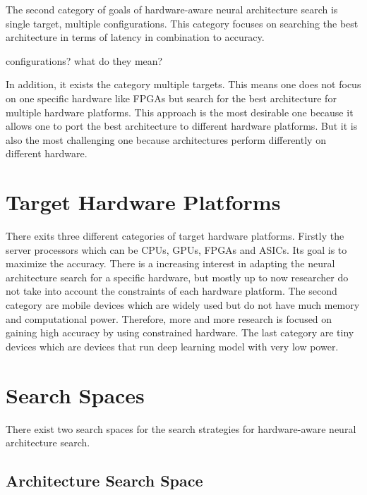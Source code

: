 \documentclass[conference]{IEEEtran}
\begin{document}
The second category of goals of hardware-aware neural architecture search is single target, multiple configurations. This category focuses on searching the best architecture in terms of latency in combination to accuracy. 

configurations? what do they mean?

In addition, it exists the category multiple targets. This means one does not focus on one specific hardware like FPGAs but search for the best architecture for multiple hardware platforms. This approach is the most desirable one because it allows one to port the best architecture to different hardware platforms. But it is also the most challenging one because architectures perform differently on different hardware. 

\section{Target Hardware Platforms}
\label{section:HWPlatforms}
There exits three different categories of target hardware platforms. Firstly the server processors which can be CPUs, GPUs, FPGAs and ASICs. Its goal is to maximize the accuracy. There is a increasing interest in adapting the neural architecture search for a specific hardware, but mostly up to now researcher do not take into account the constraints of each hardware platform. The second category are mobile devices which are widely used but do not have much memory and computational power. Therefore, more and more research is focused on gaining high accuracy by using constrained hardware. The last category are tiny devices which are devices that run deep learning model with very low power. 

\section{Search Spaces}
\label{section:SearchSpaces}

There exist two search spaces for the search strategies for hardware-aware neural architecture search. 

\subsection{Architecture Search Space}
\end{document}
